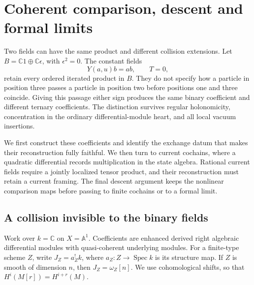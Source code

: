 \chapter{Coherent comparison, descent and formal limits}
\label{cycmp:chapter}

Two fields can have the same product and different collision extensions.
Let $B=\mathbb C1\oplus\mathbb C\epsilon$, with $\epsilon^2=0$.
The constant fields
\[
 Y(a,u)b=ab,\qquad T=0,
\]
retain every ordered iterated product in $B$. They do not specify how
a particle in position three passes a particle in position two before
positions one and three coincide. Giving this passage either sign
produces the same binary coefficient and different ternary coefficients.
The distinction survives regular holonomicity, concentration in the
ordinary differential-module heart, and all local vacuum insertions.

We first construct these coefficients and identify the exchange datum
that makes their reconstruction fully faithful. We then turn to current
cochains, where a quadratic differential records multiplication in the
state algebra. Rational current fields require a jointly localized
tensor product, and their reconstruction must retain a current framing.
The final descent argument keeps the nonlinear comparison maps before
passing to finite cochains or to a formal limit.

\section{A collision invisible to the binary fields}
\label{cycmp:sec:particles}

Work over $k=\mathbb C$ on $X=\mathbb A^1$. Coefficients are enhanced
derived right algebraic differential modules with quasi-coherent
underlying modules. For a finite-type scheme $Z$, write
$J_Z=a_Z^!k$, where $a_Z:Z\to\operatorname{Spec}k$ is its structure map.
If $Z$ is smooth of dimension $n$, then $J_Z=\omega_Z[n]$.
We use cohomological shifts, so that $H^i(M[r])=H^{i+r}(M)$.

